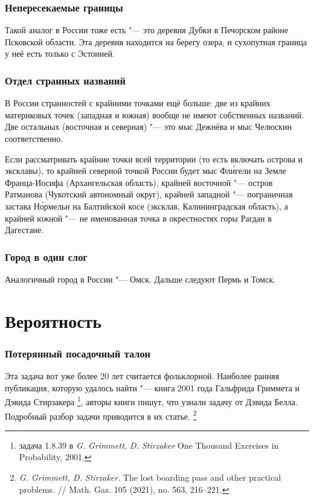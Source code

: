 \documentclass[twoside]{book}
\begin{document}
\subsubsection{Непересекаемые границы}
Такой аналог в России тоже есть "--- это деревня Дубки в Печорском  районе Псковской области.
Эта деревня находится на берегу озера, и сухопутная граница у неё есть только с Эстонией.

\subsubsection{Отдел странных названий}
В России странностей с крайними точками ещё больше: две из крайних материковых точек (западная и южная) 
вообще не имеют собственных названий. Две остальных (восточная и северная) "--- это мыс Дежнёва и мыс Челюскин
соответственно. 

Если рассматривать крайние точки всей территории (то есть включать острова и эксклавы), то крайней северной
точкой России будет мыс Фл\'{и}гели на Земле Франца-Иосифа (Архангельская область), крайней восточной "--- остров Ратманова (Чукотский автономный округ), 
крайней западной "--- пограничная застава Н\'{о}рмельн на Балтийской косе (эксклав, Калининградская область), 
а крайней южной "--- не именованная точка в окрестностях горы Рагдан в Дагестане.

\subsubsection{Город в один слог}
Аналогичный город в России "--- Омск.
Дальше следуют Пермь и Томск.

\section{Вероятность}

\subsubsection{Потерянный посадочный талон}
Эта задача вот уже более 20 лет считается фольклорной.
Наиболее ранняя публикация, которую удалось найти "--- книга 2001 года Гальфрида Гриммета и Дэвида Стирзакера%
\footnote{задача 1.8.39 в \emph{G. Grimmett, D. Stirzaker} One Thousand Exercises in Probability, 2001.},
авторы книги пишут, что узнали задачу от Дэвида Белла.
Подробный разбор задачи приводится в их статье.%
\footnote{\emph{G. Grimmett, D. Stirzaker}.
The lost boarding pass and other practical problems.
/\!/
Math. Gaz. 105 (2021), no. 563, 216--221.}
\end{document}
